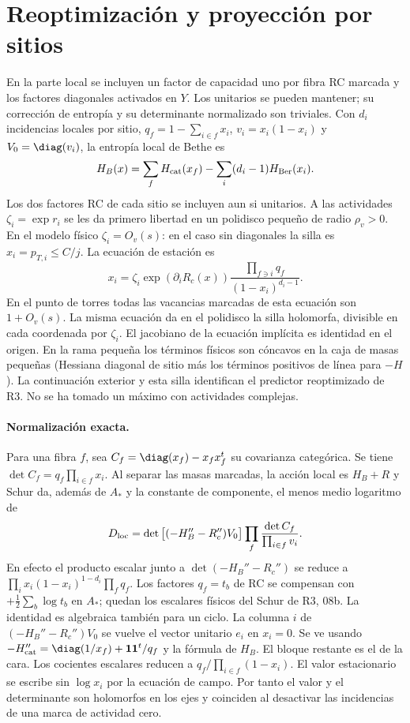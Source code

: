 \section{Reoptimización y proyección por sitios}
En la parte local se incluyen un factor de capacidad uno por fibra RC marcada y
los factores diagonales activados en $Y$. Los unitarios se pueden mantener; su
corrección de entropía y su determinante normalizado son triviales.
Con $d_i$ incidencias locales por sitio, $q_f=1-\sum_{i\in f}x_i$,
$v_i=x_i(1-x_i)$ y $V_0=\diag(v_i)$, la entropía local de Bethe es
\[
 H_B(x)=\sum_f H_{\rm cat}(x_f)-\sum_i(d_i-1)H_{\rm Ber}(x_i).
\]
Los dos factores RC de cada sitio se incluyen aun si unitarios.
A las actividades $\zeta_i=\exp r_i$ se les da primero libertad en un polidisco
pequeño de radio $\rho_v>0$. En el modelo físico $\zeta_i=O_v(s)$: en el caso
sin diagonales la silla es $x_i=p_{T,i}\le C/j$. La ecuación de estación es
\[
 x_i=\zeta_i \exp(\partial_i R_c(x))
             \frac{\prod_{f\ni i}q_f}{(1-x_i)^{d_i-1}} .
\]
En el punto de torres todas las vacancias marcadas de esta ecuación son $1+O_v(s)$.
La misma ecuación da en el polidisco la silla holomorfa, divisible en cada coordenada
por $\zeta_i$. El jacobiano de la ecuación implícita es identidad en el origen.
En la rama pequeña los términos físicos son cóncavos en la caja de masas pequeñas
(Hessiana diagonal de sitio más los términos positivos de línea para $-H$).
La continuación exterior y esta silla identifican el predictor reoptimizado de R3.
No se ha tomado un máximo con actividades complejas.

\paragraph{Normalización exacta.}
Para una fibra $f$, sea $C_f=\diag(x_f)-x_fx_f^t$ su covarianza categórica.
Se tiene $\det C_f=q_f\prod_{i\in f}x_i$. Al separar las masas marcadas, la acción
local es $H_B+R$ y Schur da, además de $A_*$ y la constante de componente,
el menos medio logaritmo de
\[
 D_{\rm loc}=\det\big[(-H_B''-R_c'') V_0\big]\prod_f
                     \frac{\det C_f}{\prod_{i\in f}v_i}.
\]
En efecto el producto escalar junto a $\det(-H_B''-R_c'')$ se reduce a
$\prod_i x_i(1-x_i)^{1-d_i}\prod_f q_f$. Los factores $q_f=t_b$ de RC
se compensan con $+\frac12\sum_b\log t_b$ en $A_*$; quedan los escalares
físicos del Schur de R3, 08b. La identidad es algebraica también para un ciclo.
La columna $i$ de $(-H_B''-R_c'')V_0$ se vuelve el vector unitario $e_i$ en $x_i=0$.
Se ve usando $-H_{\rm cat}''=\diag(1/x_f)+{\bf1}{\bf1}^t/q_f$ y la fórmula
de $H_B$. El bloque restante es el de la cara. Los cocientes escalares reducen
a $q_f/\prod_{i\in f}(1-x_i)$. El valor estacionario se escribe sin $\log x_i$
por la ecuación de campo. Por tanto el valor y el determinante son holomorfos en
los ejes y coinciden al desactivar las incidencias de una marca de actividad cero.

